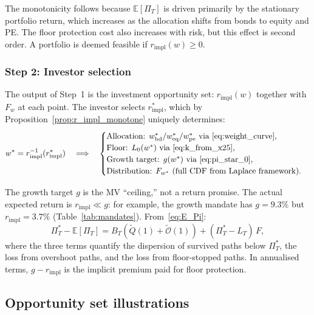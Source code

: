\documentclass[11pt,a4paper]{article}
\numberwithin{equation}{section}
\newcommand{\E}{\mathbb{E}}
\newcommand{\Ov}{\mathcal{O}} %
\begin{document}
The monotonicity follows because $\E[\Pi_T]$ is driven primarily by the 
stationary portfolio return, which increases as the allocation shifts from 
bonds to equity and PE. The floor protection cost also increases with risk, 
but this effect is second order. A portfolio is deemed feasible if 
$r_{\mathrm{impl}}(w) \geq 0$.


\subsubsection{Step 2: Investor selection}\label{sec:client_selection}

The output of Step~1 is the investment opportunity set: $r_{\mathrm{impl}}(w)$ 
together with $F_w$ at each point. The investor selects 
$r^*_{\mathrm{impl}}$, which by 
Proposition~\ref{prop:r_impl_monotone} uniquely determines:
\begin{equation}\label{eq:client_selection}
w^* = r_{\mathrm{impl}}^{-1}(r^*_{\mathrm{impl}}) \quad 
\Longrightarrow \quad
\begin{cases}
\text{Allocation: } w^*_{\mathrm{bd}} / w^*_{\mathrm{eq}} / 
  w^*_{\mathrm{pe}} \text{ via \eqref{eq:weight_curve}}, \\
\text{Floor: } L_0(w^*) \text{ via \eqref{eq:k_from_x25}}, \\
\text{Growth target: } g(w^*) \text{ via \eqref{eq:pi_star_0}}, \\
\text{Distribution: } F_{w^*} \text{ (full CDF from Laplace framework)}.
\end{cases}
\end{equation}

The growth target $g$ is the MV ``ceiling,'' not a return promise. The 
actual expected return is $r_{\mathrm{impl}} \ll g$: for example, the 
growth mandate has $g = 9.3\%$ but $r_{\mathrm{impl}} = 3.7\%$ 
(Table~\ref{tab:mandates}). From~\eqref{eq:E_Pi}:
\begin{equation}\label{eq:gap_decomposition}
\Pi^*_T - \E[\Pi_T] = B_T\!\left(\widetilde{Q}(1) 
+ \widetilde{\Ov}(1)\right) + (\Pi^*_T - L_T)\, F,
\end{equation}
where the three terms quantify the dispersion of survived paths below 
$\Pi^*_T$, the loss from overshoot paths, and the loss from floor-stopped 
paths. In annualised terms, $g - r_{\mathrm{impl}}$ is the implicit 
premium paid for floor protection.


\subsection{Opportunity set illustrations}\label{sec:opp_numerics}
\end{document}
